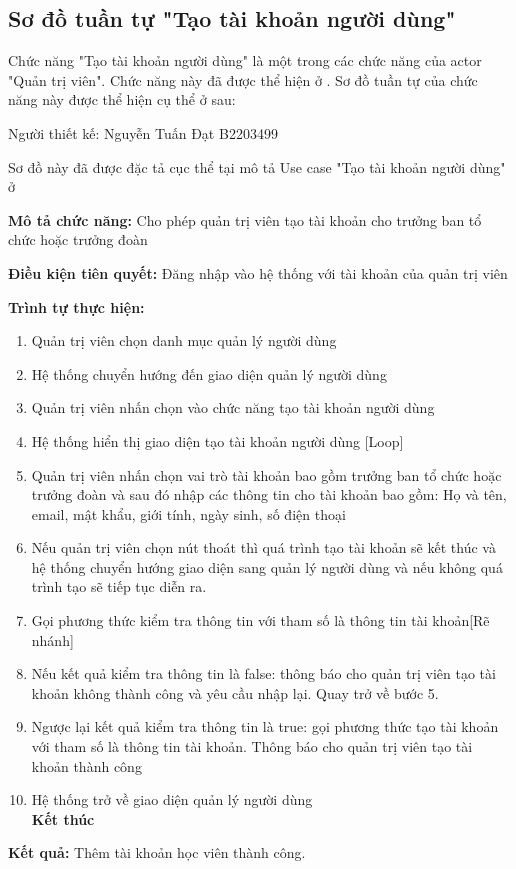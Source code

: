 \subsection{Sơ đồ tuần tự "Tạo tài khoản người dùng"}
\setcounter{figure}{0}

Chức năng "Tạo tài khoản người dùng" là một trong các chức năng của actor "Quản trị viên".
Chức năng này đã được thể hiện ở .
Sơ đồ tuần tự của chức năng này được thể hiện cụ thể ở \myref{} sau:

Người thiết kế: Nguyễn Tuấn Đạt B2203499

Sơ đồ này đã được đặc tả cục thể tại mô tả Use case
"Tạo tài khoản người dùng" ở 

\noindent
\textbf{Mô tả chức năng:} Cho phép quản trị viên tạo tài khoản cho trưởng ban tổ chức hoặc trưởng đoàn

\noindent
\textbf{Điều kiện tiên quyết:} Đăng nhập vào hệ thống với tài khoản của quản trị viên

\noindent
\textbf{Trình tự thực hiện:}

\noindent
\begin{enumerate}
  \item Quản trị viên chọn danh mục quản lý người dùng
  \item Hệ thống chuyển hướng đến giao diện quản lý người dùng
  \item Quản trị viên nhấn chọn vào chức năng tạo tài khoản người dùng
  \item Hệ thống hiển thị giao diện tạo tài khoản người dùng [Loop]
  \item Quản trị viên nhấn chọn vai trò tài khoản bao gồm trưởng ban tổ chức hoặc trưởng đoàn và sau đó nhập các thông tin cho tài khoản bao gồm: Họ và tên, email, mật khẩu, giới tính, ngày sinh, số điện thoại
  \item Nếu quản trị viên chọn nút thoát thì quá trình tạo tài khoản sẽ kết thúc và hệ thống chuyển hướng giao diện sang quản lý người dùng và nếu không quá trình tạo sẽ tiếp tục diễn ra.
  \item Gọi phương thức kiểm tra thông tin với tham số là thông tin tài khoản[Rẽ nhánh]
  \item Nếu kết quả kiểm tra thông tin là false: thông báo cho quản trị viên tạo tài khoản không thành công và yêu cầu nhập lại. Quay trở về bước 5.
  \item Ngược lại kết quả kiểm tra thông tin là true: gọi phương thức tạo tài khoản với tham số là thông tin tài khoản. Thông báo cho quản trị viên tạo tài khoản thành công
  \item Hệ thống trở về giao diện quản lý người dùng
        \\\textbf{Kết thúc}
\end{enumerate}

\noindent
\textbf{Kết quả:} Thêm tài khoản học viên thành công.

